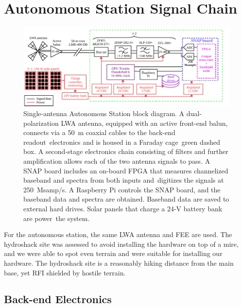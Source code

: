 \section{Autonomous Station Signal Chain}

\begin{figure}
	\begin{center}
		\includegraphics[width=\linewidth]{Figures/albatros_single_schematic.pdf}
		\caption{Single-antenna Autonomous Station block diagram. A dual-polarization LWA antenna, equipped with an active front-end balun, connects via a \SI{50}{\meter} coaxial cables to the back-end readout electronics and is housed in a Faraday cage green dashed box. A second-stage electronics chain consisting of filters and further amplification allows each of the two antenna signals to pass. A SNAP board includes an on-board FPGA that measures channelized baseband and spectra from both inputs and digitizes the signals at 250~Msamp/s. A Raspberry Pi controls the SNAP board, and the baseband data and spectra are obtained. Baseband data are saved to external hard drives. Solar panels that charge a 24-V battery bank are power the system.}
		\label{Fig:albatros1_schem}
	\end{center}
\end{figure}

For the autonomous station, the same LWA antenna and FEE are used. The hydroshack site was assessed to avoid installing the hardware on top of a mire, and we were able to spot even terrain and were suitable for installing our hardware. The hydroshack site is a reasonably hiking distance from the main base, yet RFI shielded by hostile terrain.

\subsection{Back-end Electronics} 

